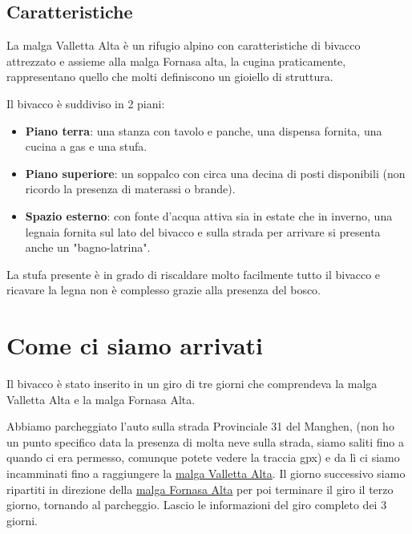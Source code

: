 \documentclass{article}
\begin{document}
\subsection{Caratteristiche}
La malga Valletta Alta è un rifugio alpino con caratteristiche di bivacco attrezzato e assieme alla malga Fornasa alta, la cugina praticamente, rappresentano quello che molti definiscono un gioiello di struttura.

Il bivacco è suddiviso in 2 piani:
\begin{itemize}
    \item \textbf{Piano terra}: una stanza con tavolo e panche, una dispensa fornita, una cucina a gas e una stufa.
    \item \textbf{Piano superiore}: un soppalco con circa una decina di posti disponibili (non ricordo la presenza di materassi o brande).
    \item \textbf{Spazio esterno}: con fonte d'acqua attiva sia in estate che in inverno, una legnaia fornita sul lato del bivacco e sulla strada per arrivare si presenta anche un "bagno-latrina".
\end{itemize}

La stufa presente è in grado di riscaldare molto facilmente tutto il bivacco e ricavare la legna non è complesso grazie alla presenza del bosco.

\section{Come ci siamo arrivati}
Il bivacco è stato inserito in un giro di tre giorni che comprendeva la malga Valletta Alta e la malga Fornasa Alta.

Abbiamo parcheggiato l’auto sulla strada Provinciale 31 del Manghen, (non ho un punto specifico data la presenza di molta neve sulla strada, siamo saliti fino a quando ci era permesso, comunque potete vedere la traccia gpx) e da lì ci siamo incamminati fino a raggiungere la \href{https://maps.google.com/?q=46.18633,11.39534}{malga Valletta Alta}. Il giorno successivo siamo ripartiti in direzione della \href{https://maps.google.com/?q=46.17745,11.40920}{malga Fornasa Alta} per poi terminare il giro il terzo giorno, tornando al parcheggio.
Lascio le informazioni del giro completo dei 3 giorni.
\end{document}
